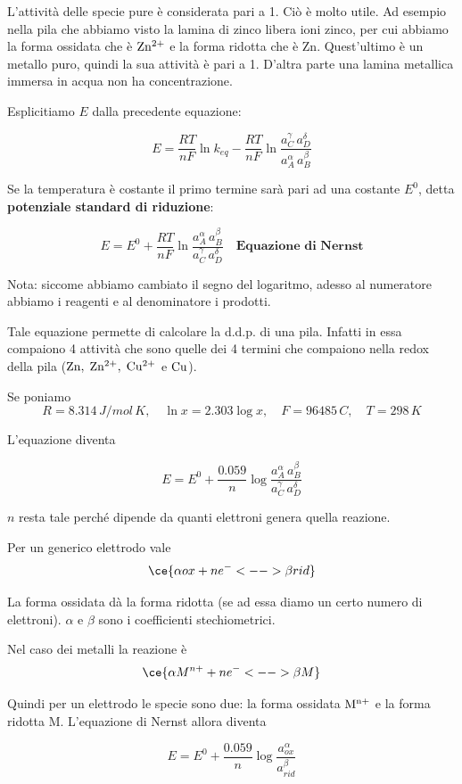L'attività delle specie pure è considerata pari a 1. Ciò è molto utile. Ad esempio nella pila che abbiamo visto la lamina di zinco libera ioni zinco, per cui abbiamo la forma ossidata che è $\rm Zn^{2+}$ e la forma ridotta che è Zn. Quest'ultimo è un metallo puro, quindi la sua attività è pari a 1. D'altra parte una lamina metallica immersa in acqua non ha concentrazione.

Esplicitiamo $E$ dalla precedente equazione:

$$E=\frac{RT}{nF}\ln k_{eq} - \frac{RT}{nF}\ln \frac{a_C^{\gamma} \, a_D^{\delta}}{a_A^{\alpha} \, a_B^{\beta}}$$

Se la temperatura è costante il primo termine sarà pari ad una costante $E^0$, detta \textbf{potenziale standard di riduzione}:

$$E= E^0 + \frac{RT}{nF}\ln \frac{a_A^{\alpha} \, a_B^{\beta}}{a_C^{\gamma} \, a_D^{\delta}} \quad \textbf{Equazione di Nernst}$$

Nota: siccome abbiamo cambiato il segno del logaritmo, adesso al numeratore abbiamo i reagenti e al denominatore i prodotti.

Tale equazione permette di calcolare la d.d.p. di una pila. Infatti in essa compaiono 4 attività che sono quelle dei 4 termini che compaiono nella redox della pila ($\rm Zn, \; Zn^{2+}, \; Cu^{2+}$ e $\rm Cu$).

Se poniamo
$$R=8.314 \, J/mol\,K, \quad \ln x = 2.303 \log x, \quad F=96485 \, C, \quad T=298 \,K$$

L'equazione diventa

$$E = E^0 + \frac{0.059}{n}\log \frac{a_A^{\alpha} \, a_B^{\beta}}{a_C^{\gamma} \, a_D^{\delta}}$$

$n$ resta tale perché dipende da quanti elettroni genera quella reazione.

\vspace{0.2cm}Per un generico elettrodo vale
$$\ce{\alpha ox + ne^- <--> \beta rid}$$

La forma ossidata dà la forma ridotta (se ad essa diamo un certo numero di elettroni). $\alpha$ e $\beta$ sono i coefficienti stechiometrici.

Nel caso dei metalli la reazione è
$$\ce{\alpha M^{n+} + ne^- <--> \beta M}$$

Quindi per un elettrodo le specie sono due: la forma ossidata $\rm M^{n+}$ e la forma ridotta M. L'equazione di Nernst allora diventa

$$E = E^0 + \frac{0.059}{n}\log \frac{a_{ox}^{\alpha}}{a_{rid}^{\beta}}$$

